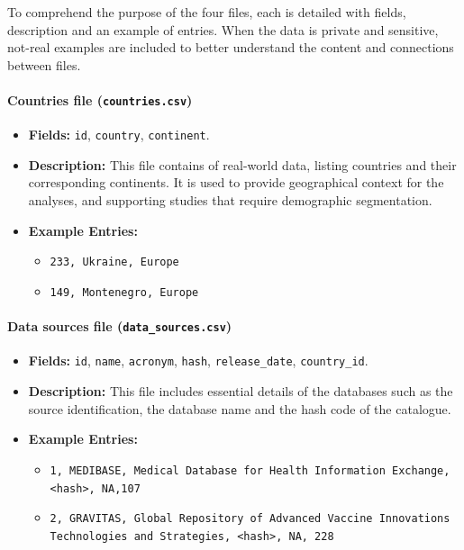 To comprehend the purpose of the four files, each is detailed with fields, description and an example of entries. When the data is private and sensitive, not-real examples are included to better understand the content and connections between files.


\paragraph{Countries file {\small\normalfont(\texttt{countries.csv})}}

\begin{itemize}
    \item \textbf{Fields:} \texttt{id}, \texttt{country}, \texttt{continent}.
    \item \textbf{Description:} This file contains of real-world data, listing countries and their corresponding continents. It is used to provide geographical context for the analyses, and supporting studies that require demographic segmentation.
    \item \textbf{Example Entries:}
    \begin{itemize}
        \item \texttt{233, Ukraine, Europe}
        \item \texttt{149, Montenegro, Europe}
    \end{itemize}
\end{itemize}


\paragraph{Data sources file {\small\normalfont(\texttt{data\_sources.csv})}}

\begin{itemize}
    \item {\raggedright\textbf{Fields:} \texttt{id}, \texttt{name}, \texttt{acronym}, \texttt{hash}, \texttt{release\_date}, \texttt{country\_id}.\par}
    \item \textbf{Description:} This file includes essential details of the databases such as the source identification, the database name and the hash code of the {\ehden} catalogue.
    \item \textbf{Example Entries:}
    \begin{itemize}
        \item \texttt{1, MEDIBASE, Medical Database for Health Information Exchange, <hash>, NA,107}
        \item \texttt{2, GRAVITAS, Global Repository of Advanced Vaccine Innovations Technologies and Strategies, <hash>, NA, 228}
    \end{itemize}
\end{itemize}

